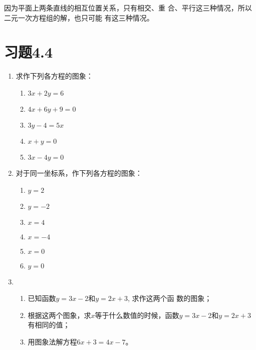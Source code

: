 因为平面上两条直线的相互位置关系，只有相交、重
合、平行这三种情况，所以二元一次方程组的解，也只可能
有这三种情况。

\section*{习题4.4}
\begin{enumerate}
    \item 
    求作下列各方程的图象：
\begin{multicols}{2}
\begin{enumerate}
    \item $3x+2y=6$
    \item $4x+6y+9=0$
    \item $3y-4=5x$
    \item $x+y=0$
    \item $3x-4y=0$
\end{enumerate}
\end{multicols}
 
 \item 对于同一坐标系，作下列各方程的图象：
 \begin{multicols}{2}
    \begin{enumerate}
        \item $y=2$
        \item $y=-2$
        \item $x=4$
        \item $x=-4$
        \item $x=0$
        \item $y=0$
    \end{enumerate}
    \end{multicols}
\item \begin{enumerate}
   \item 已知函数$y=3x-2$和$y=2x+3$, 求作这两个函
    数的图象；
    \item 根据这两个图象，求$x$等于什么数值的时候，函数$y=3x-2$和$y=2x+3$有相同的值；
    \item 用图象法解方程$6x+3=4x-7$。 
\end{enumerate}


\end{enumerate}
